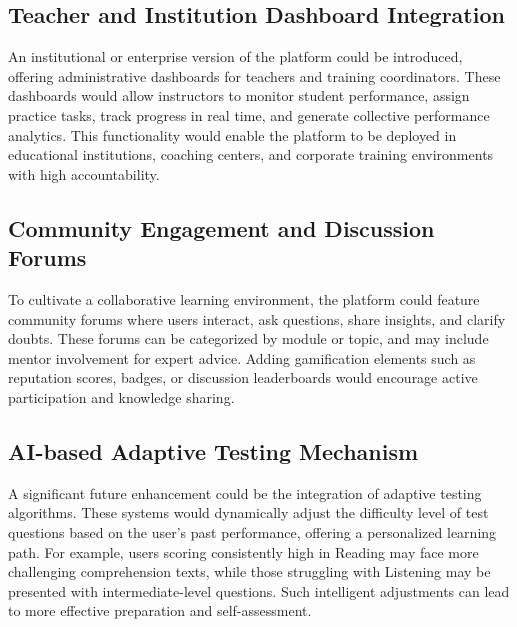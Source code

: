 \documentclass[a4paper,12pt]{article}
\begin{document}
\vspace{0.5cm}

\subsection{Teacher and Institution Dashboard Integration}

An institutional or enterprise version of the platform could be introduced, offering administrative dashboards for teachers and training coordinators. These dashboards would allow instructors to monitor student performance, assign practice tasks, track progress in real time, and generate collective performance analytics. This functionality would enable the platform to be deployed in educational institutions, coaching centers, and corporate training environments with high accountability.

\vspace{0.5cm}

\subsection{Community Engagement and Discussion Forums}

To cultivate a collaborative learning environment, the platform could feature community forums where users interact, ask questions, share insights, and clarify doubts. These forums can be categorized by module or topic, and may include mentor involvement for expert advice. Adding gamification elements such as reputation scores, badges, or discussion leaderboards would encourage active participation and knowledge sharing.

\vspace{0.5cm}

\subsection{AI-based Adaptive Testing Mechanism}

A significant future enhancement could be the integration of adaptive testing algorithms. These systems would dynamically adjust the difficulty level of test questions based on the user’s past performance, offering a personalized learning path. For example, users scoring consistently high in Reading may face more challenging comprehension texts, while those struggling with Listening may be presented with intermediate-level questions. Such intelligent adjustments can lead to more effective preparation and self-assessment.
\end{document}
